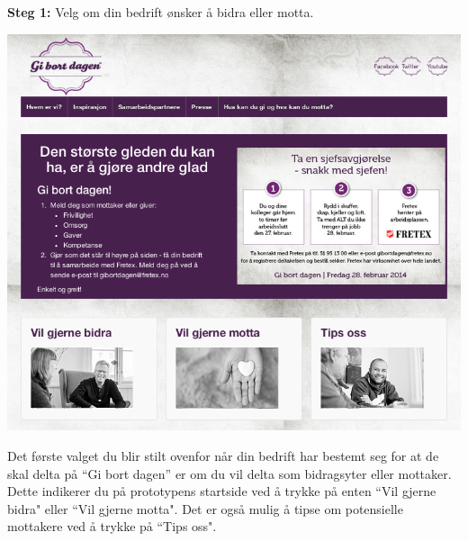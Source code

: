 {\bf Steg 1:} Velg om din bedrift ønsker å bidra eller motta.
\begin{center}
\includegraphics[clip=true, width=1 \textwidth,
trim=0cm 0cm 0cm 0cm]{startside.png}
\label{fig:startside}
\end{center}

Det første valget du blir stilt ovenfor når din bedrift har bestemt seg for at de skal delta på “Gi bort dagen” er om du vil delta som bidragsyter eller mottaker. Dette indikerer du på prototypens startside ved å trykke på enten ``Vil gjerne bidra" eller ``Vil gjerne motta". Det er også mulig å tipse om potensielle mottakere ved å trykke på ``Tips oss".\\

